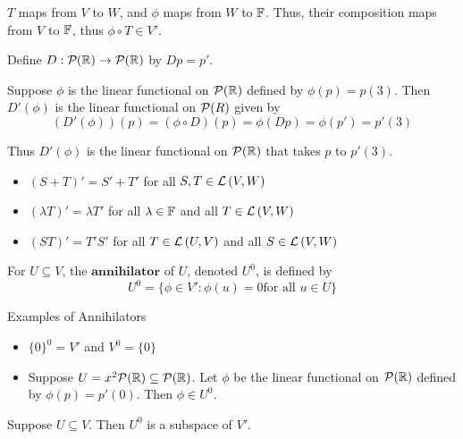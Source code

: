 $T$ maps from $V$ to $W$, and $\phi$ maps from $W$ to $\operatorname{\mathbb{F}}$.
Thus, their composition maps from $V$ to $\operatorname{\mathbb{F}}$, thus $\phi \circ T \in V'$.

\begin{example}
   Define $D : \Polys{\R}{\empty} \to \PolysAll{\R}$ by $Dp = p'$.
   
   Suppose $\phi$ is the linear functional on $\mathcal{P}(\operatorname{\mathbb{R}})$ defined
   by $\phi(p) = p(3)$.
   Then $D'(\phi)$ is the linear functional on $\mathcal{P}(R)$ given by
   \[ (D'(\phi))(p) = (\phi \circ D)(p) = \phi(Dp) = \phi(p') = p'(3) \]

   Thus $D'(\phi)$ is the linear functional on $\mathcal{P}(\operatorname{\mathbb{R}})$ that takes
   $p$ to $p'(3)$.
\end{example}

\begin{theorem} 
   \begin{itemize}
      \item $(S + T)' = S' + T'$ for all $S, T \in \mathcal{L} \left( V, W \right)$
      \item $(\lambda T)' = \lambda T'$ for all $\lambda \in \operatorname{\mathbb{F}}$ and all $T \in \mathcal{L} \left( V, W \right)$
      \item $(ST)' = T'S'$ for all $T \in \mathcal{L} \left( U, V \right)$ and all $S \in \mathcal{L} \left( V, W \right)$
   \end{itemize}
\end{theorem}

\begin{definition} [Annihilator]
   For $U \subseteq V$, the $\textbf{annihilator}$ of $U$, denoted
   $U^0$, is defined by
   \[ U^0 = \{ \phi \in V' : \phi(u) = 0 \text{for all } u \in U \} \]
\end{definition}

\begin{example} Examples of Annihilators 
   \begin{itemize}
      \item $\{0\}^0 = V'$ and $V^0 = \{0\}$
      \item Suppose $U = x^2 \mathcal{P}(\operatorname{\mathbb{R}}) \subseteq \mathcal{P}(\operatorname{\mathbb{R}})$. Let
      $\phi$ be the linear functional on $\mathcal{P}(\operatorname{\mathbb{R}})$ defined by $\phi(p) = p'(0)$.
      Then $\phi \in U^0$.
   \end{itemize}
\end{example}

\begin{theorem}
   Suppose $U \subseteq V$. Then $U^0$ is a subspace of $V'$.
\end{theorem}

